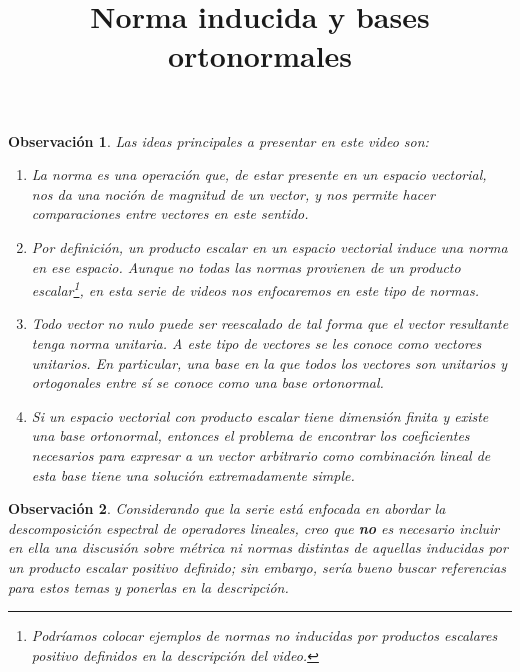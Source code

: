 \documentclass[12pt,dvipsnames]{article}
\newtheorem{obs}{Observación}[section]
\numberwithin{equation}{section}
\begin{document}
\title{Norma inducida y bases ortonormales}
\date{}
\maketitle

\begin{obs}
    Las ideas principales a presentar en este video son:

    \begin{enumerate}[label=(\roman*)]
        \item La norma es una operación que, de estar presente en un espacio vectorial, nos da una noción de \emph{magnitud} de un vector, y nos permite hacer comparaciones entre vectores en este sentido. 

        \item Por definición, un producto escalar en un espacio vectorial induce una norma en ese espacio. Aunque no todas las normas provienen de un producto escalar\footnote{Podríamos colocar ejemplos de normas no inducidas por productos escalares positivo definidos en la descripción del video.}, en esta serie de videos nos enfocaremos en este tipo de normas. 

        \item Todo vector no nulo puede ser reescalado de tal forma que el vector resultante tenga norma unitaria. A este tipo de vectores se les conoce como vectores unitarios. En particular, una base en la que todos los vectores son unitarios y ortogonales entre sí se conoce como una base ortonormal.

        \item Si un espacio vectorial con producto escalar tiene dimensión finita y existe una base ortonormal, entonces el problema de encontrar los coeficientes necesarios para expresar a un vector arbitrario como combinación lineal de esta base tiene una solución extremadamente simple.
    \end{enumerate}
\end{obs}

\begin{obs}
Considerando que la serie está enfocada en abordar la descomposición espectral de operadores lineales, creo que \textbf{no} es necesario incluir en ella una discusión sobre métrica ni normas distintas de aquellas inducidas por un producto escalar positivo definido; sin embargo, sería bueno buscar referencias para estos temas y ponerlas en la descripción.
\end{obs}
\end{document}

